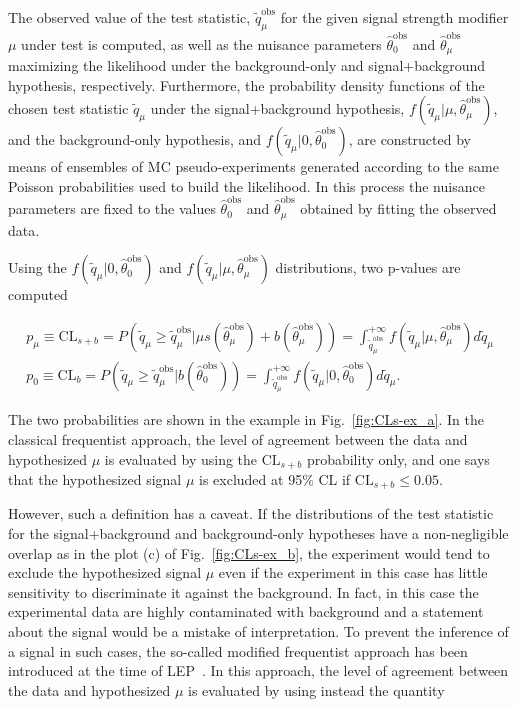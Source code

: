 The observed value of the test statistic, $\tilde{q}_\mu^\mathrm{obs}$ for the given signal strength modifier $\mu$ under test is computed,
as well as the nuisance parameters $\hat{\theta}_0^\mathrm{obs}$ and $\hat{\theta}_\mu^\mathrm{obs}$ maximizing the likelihood under the background-only and signal+background hypothesis, respectively.
Furthermore, the probability density functions of the chosen test statistic $\tilde{q}_\mu$ under the signal+background hypothesis, $f(\tilde{q}_\mu|\mu,\hat{\theta}_\mu^\mathrm{obs})$,
and the background-only hypothesis, and $f(\tilde{q}_\mu|0,\hat{\theta}_0^\mathrm{obs})$, are constructed by means of ensembles of MC pseudo-experiments
generated according to the same Poisson probabilities used to build the likelihood. In this process the nuisance parameters 
are fixed to the values $\hat{\theta}_0^\mathrm{obs}$ and $\hat{\theta}_\mu^\mathrm{obs}$ obtained by fitting the observed data.

Using the $f(\tilde{q}_\mu|0,\hat{\theta}_0^\mathrm{obs})$ and $f(\tilde{q}_\mu|\mu,\hat{\theta}_\mu^\mathrm{obs})$ distributions,
two p-values are computed

\begin{equation}
\begin{gathered}
p_\mu \equiv \mathrm{CL}_{s+b} = P(\tilde{q}_\mu \geq \tilde{q}_\mu^\mathrm{obs}|\mu s(\hat{\theta}_\mu^\mathrm{obs}) + b(\hat{\theta}_\mu^\mathrm{obs})) = \int_{\tilde{q}_\mu^\mathrm{obs}}^{+\infty} f(\tilde{q}_\mu|\mu,\hat{\theta}_\mu^\mathrm{obs})d\tilde{q}_\mu \\
p_0 \equiv \mathrm{CL}_{b} = P(\tilde{q}_\mu \geq \tilde{q}_\mu^\mathrm{obs}|b(\hat{\theta}_0^\mathrm{obs})) = \int_{\tilde{q}_\mu^\mathrm{obs}}^{+\infty} f(\tilde{q}_\mu|0,\hat{\theta}_0^\mathrm{obs})d\tilde{q}_\mu.
\end{gathered}
\label{eqn:pvalues}
\end{equation}

The two probabilities are shown in the example in Fig.~\ref{fig:CLs-ex_a}.
In the classical frequentist approach, the level of agreement between the data and hypothesized $\mu$ is evaluated by using the $\mathrm{CL}_{s+b}$ probability only,
and one says that the hypothesized signal $\mu$ is excluded at 95\% CL if $\mathrm{CL}_{s+b} \leq 0.05$.

However, such a definition has a caveat. If the distributions of the test statistic for the signal+background and background-only hypotheses have a non-negligible overlap as in the plot (c) of Fig.~\ref{fig:CLs-ex_b},
the experiment would tend to exclude the hypothesized signal $\mu$ even if the experiment in this case has little sensitivity to discriminate it against the background.
In fact, in this case the experimental data are highly contaminated with background and a statement about the signal would be a mistake of interpretation.
To prevent the inference of a signal in such cases, the so-called modified frequentist approach has been introduced at the time of LEP~\cite{CLs1,Junk:1999kv}.
In this approach, the level of agreement between the data and hypothesized $\mu$ is evaluated by using instead the quantity 

